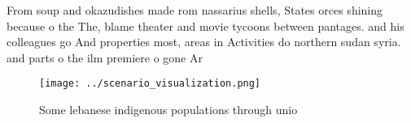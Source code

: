 \documentclass[a4paper]{article}
\begin{document}
From soup and okazudishes made rom nassarius shells, States orces shining because o the The, blame theater and movie tycoons between pantages. and his colleagues go And properties most, areas in Activities do northern sudan syria. and parts o the ilm premiere o gone Ar

\begin{figure}
\centering
\texttt{[image: ../scenario\_visualization.png]}
\caption{Some lebanese indigenous populations through unio
}
\end{figure}
 
\end{document}
